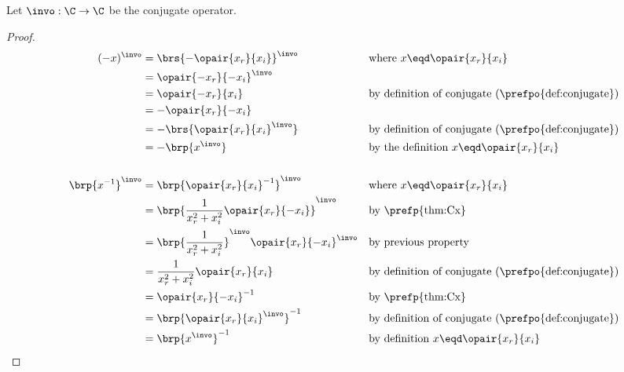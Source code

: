 \begin{theorem}
\label{thm:C_inv_conj}
 
Let $\invo:\C\to\C$ be the conjugate operator.
\end{theorem}
\begin{proof}
\begin{align*}
   (-x)^\invo
     &= \brs{-\opair{x_r}{x_i}}^\invo
    && \text{where $x\eqd\opair{x_r}{x_i}$}
   \\&= \opair{-x_r}{-x_i}^\invo
   \\&= \opair{-x_r}{x_i}
    && \text{by definition of conjugate (\prefpo{def:conjugate})}
   \\&= -\opair{x_r}{-x_i}
   \\&= -\brs{\opair{x_r}{x_i}^\invo}
    && \text{by definition of conjugate (\prefpo{def:conjugate})}
   \\&= -\brp{x^\invo}
    && \text{by the definition $x\eqd\opair{x_r}{x_i}$}
\\
\\
  \brp{x^{-1}}^\invo
    &= \brp{\opair{x_r}{x_i}^{-1}}^\invo
    && \text{where $x\eqd\opair{x_r}{x_i}$}
  \\&= \brp{\frac{1}{x_r^2+x_i^2}\opair{x_r}{-x_i}}^\invo
    && \text{by \prefp{thm:Cx}}
  \\&= \brp{\frac{1}{x_r^2+x_i^2}}^\invo \opair{x_r}{-x_i}^\invo
    && \text{by previous property}
  \\&= \frac{1}{x_r^2+x_i^2}\opair{x_r}{x_i}
    && \text{by definition of conjugate (\prefpo{def:conjugate})}
  \\&= \opair{x_r}{-x_i}^{-1}
    && \text{by \prefp{thm:Cx}}
  \\&= \brp{\opair{x_r}{x_i}^\invo}^{-1}
    && \text{by definition of conjugate (\prefpo{def:conjugate})}
  \\&= \brp{x^\invo}^{-1}
    && \text{by definition $x\eqd\opair{x_r}{x_i}$}
\end{align*}
\end{proof}




